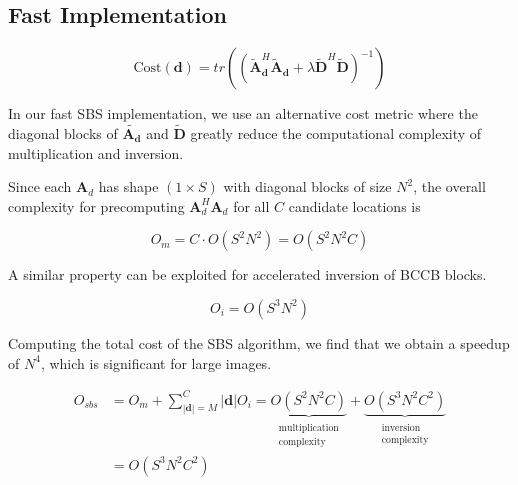 \documentclass{article}
\begin{document}

\subsection{Fast Implementation}

$$
\text{Cost}(\bm{d}) = tr\left(\left(
\widetilde{\bm A}_{\bm d}^H \widetilde{\bm A}_{\bm d} + \lambda \widetilde{\bm D}^H
\widetilde{\bm D} \right)^{-1} \right)
$$

In our fast SBS implementation, we use an alternative cost metric where the
diagonal blocks of $\widetilde{\bm{A}_{\bm{d}}}$ and $\widetilde{\bm{D}}$ greatly
  reduce the computational complexity of multiplication and inversion.

Since each $\bm{A}_d$ has shape $(1 \times S)$ with diagonal blocks of size $N^2$, the overall complexity for
precomputing $\bm{A}^H_d \bm{A}_d$ for all $C$ candidate locations is

$$
O_m = C \cdot O(S^2N^2) = O(S^2N^2C)
$$

A similar property can be exploited for accelerated inversion of BCCB blocks. \cite{kamaci2017}

$$
O_i = O(S^3N^2)
$$

Computing the total cost of the SBS algorithm, we find that we obtain a
speedup of $N^4$, which is significant for large images.

\begin{align*}
  O_{sbs} &= O_m + \sum_{|\bm{d}| = M}^C |\bm{d}| O_i =
  \underbrace{
  O(S^2N^2C)
  }_{\substack{\text{multiplication}\\ \text{complexity}}}
  +
  \underbrace{
  O(S^3N^2C^2)
  }_{\substack{\text{inversion}\\ \text{complexity}}} \\
  &= O(S^3N^2C^2)
\end{align*}
\end{document}
